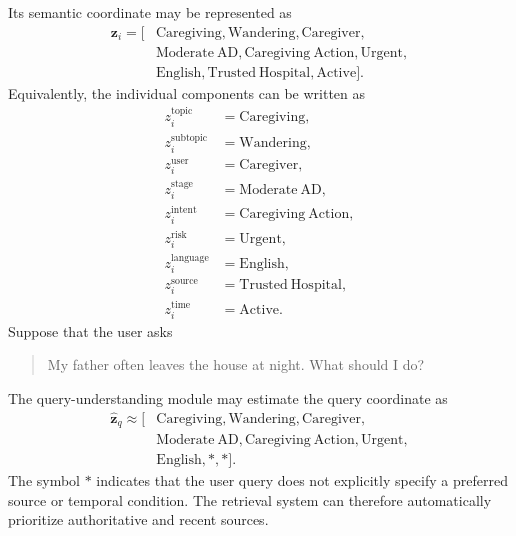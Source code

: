 \documentclass{article}
\begin{document}
Its semantic coordinate may be represented as
\begin{equation}
\begin{split}
    \mathbf{z}_i =
    [&
    \mathrm{Caregiving},
    \mathrm{Wandering},
    \mathrm{Caregiver},\\
    &
    \mathrm{Moderate\ AD},
    \mathrm{Caregiving\ Action},
    \mathrm{Urgent},\\
    &
    \mathrm{English},
    \mathrm{Trusted\ Hospital},
    \mathrm{Active}
    ].
\end{split}
\end{equation}
Equivalently, the individual components can be written as
\begin{align}
    z_i^{\mathrm{topic}}
    &= \mathrm{Caregiving},\\
    z_i^{\mathrm{subtopic}}
    &= \mathrm{Wandering},\\
    z_i^{\mathrm{user}}
    &= \mathrm{Caregiver},\\
    z_i^{\mathrm{stage}}
    &= \mathrm{Moderate\ AD},\\
    z_i^{\mathrm{intent}}
    &= \mathrm{Caregiving\ Action},\\
    z_i^{\mathrm{risk}}
    &= \mathrm{Urgent},\\
    z_i^{\mathrm{language}}
    &= \mathrm{English},\\
    z_i^{\mathrm{source}}
    &= \mathrm{Trusted\ Hospital},\\
    z_i^{\mathrm{time}}
    &= \mathrm{Active}.
\end{align}
Suppose that the user asks
\begin{quote}
My father often leaves the house at night. What should I do?
\end{quote}

The query-understanding module may estimate the query coordinate as
\begin{equation}
\begin{split}
    \hat{\mathbf{z}}_q \approx
    [&
    \mathrm{Caregiving},
    \mathrm{Wandering},
    \mathrm{Caregiver},\\
    &
    \mathrm{Moderate\ AD},
    \mathrm{Caregiving\ Action},
    \mathrm{Urgent},\\
    &
    \mathrm{English},
    *,
    *
    ].
\end{split}
\end{equation}
The symbol $*$ indicates that the user query does not explicitly specify a preferred source or temporal condition. The retrieval system can therefore automatically prioritize authoritative and recent sources.
\end{document}
